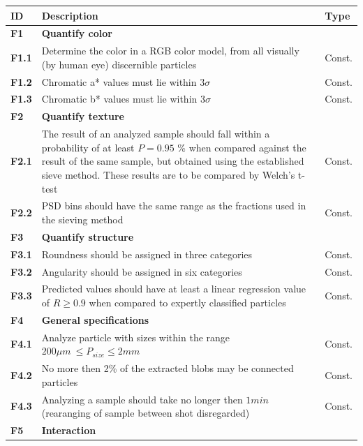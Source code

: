\documentclass[11pt,fleqn,,a4paper,twoside,openright]{book}
\begin{document}
\begin{longtable}{|p{1cm}| p{10cm} p{1.5cm}|}
\hline
\textbf{ID} & \textbf{Description} & \textbf{Type} \\
\endhead
\hline
\textbf{F1}\label{F1} & \textbf{Quantify color} &  \\
\hline
\textbf{F1.1}\label{F1.1} & Determine the color in a RGB color model, from all visually (by human eye) discernible particles & Const. \\
\hline
\textbf{F1.2}\label{F1.2} & Chromatic a* values must lie within $3 \sigma$ & Const. \\
\hline
\textbf{F1.3}\label{F1.3} & Chromatic b* values must lie within $3 \sigma$ & Const. \\
\hline
\textbf{F2}\label{F2} & \textbf{Quantify texture} &  \\
\hline
\textbf{F2.1}\label{F2.1} & The result of an analyzed sample should fall within a probability of at least $P = 0.95$ \% when compared against the result of the same sample, but obtained using the established sieve method. These results are to be compared by Welch's t-test  &  Const. \\
\hline
\textbf{F2.2}\label{F2.2} & PSD bins should have the same range as the fractions used in the sieving method & Const. \\
\hline
\textbf{F3}\label{F3} & \textbf{Quantify structure}  &  \\
\hline
\textbf{F3.1}\label{F3.1} & Roundness should be assigned in three categories  & Const. \\
\hline
\textbf{F3.2}\label{F3.2} & Angularity should be assigned in six categories  & Const. \\
\hline
\textbf{F3.3}\label{F3.3} & Predicted values should have at least a linear regression value of $ R \geq 0.9 $ when compared to expertly classified particles & Const.  \\
\hline
\textbf{F4}\label{F4} & \textbf{General specifications} &  \\
\hline
\textbf{F4.1}\label{F4.1} & Analyze particle with sizes within the range $ 200 \mu m\ \leq P_{size} \leq 2 mm $& Const. \\
\hline
\textbf{F4.2}\label{F4.2} & No more then 2\% of the extracted blobs may be connected particles & Const. \\
\hline
\textbf{F4.3}\label{F4.3} & Analyzing a sample should take no longer then $ 1 min$ (rearanging of sample between shot disregarded) & Const. \\
\hline
\textbf{F5}\label{F5} & \textbf{Interaction} &  \\

\end{longtable}
\end{document}

